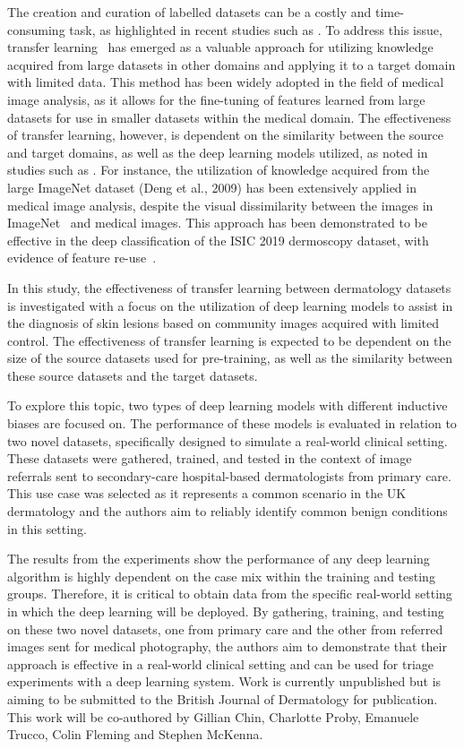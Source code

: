 The creation and curation of labelled datasets can be a costly and time-consuming task, as highlighted in recent studies such as \cite{chin2022prepare}. To address this issue, transfer learning~\citep{srinidhi2020deep} has emerged as a valuable approach for utilizing knowledge acquired from large datasets in other domains and applying it to a target domain with limited data. This method has been widely adopted in the field of medical image analysis, as it allows for the fine-tuning of features learned from large datasets for use in smaller datasets within the medical domain. The effectiveness of transfer learning, however, is dependent on the similarity between the source and target domains, as well as the deep learning models utilized, as noted in studies such as \cite{matsoukas2022makes}. For instance, the utilization of knowledge acquired from the large ImageNet dataset (Deng et al., 2009) has been extensively applied in medical image analysis, despite the visual dissimilarity between the images in ImageNet~\citep{deng2009imagenet} and medical images. This approach has been demonstrated to be effective in the deep classification of the ISIC 2019 dermoscopy dataset, with evidence of feature re-use~\citep{matsoukas2022makes}.

In this study, the effectiveness of transfer learning between dermatology datasets is investigated with a focus on the utilization of deep learning models to assist in the diagnosis of skin lesions based on community images acquired with limited control. The effectiveness of transfer learning is expected to be dependent on the size of the source datasets used for pre-training, as well as the similarity between these source datasets and the target datasets.

To explore this topic, two types of deep learning models with different inductive biases are focused on. The performance of these models is evaluated in relation to two novel datasets, specifically designed to simulate a real-world clinical setting. These datasets were gathered, trained, and tested in the context of image referrals sent to secondary-care hospital-based dermatologists from primary care. This use case was selected as it represents a common scenario in the UK dermatology and the authors aim to reliably identify common benign conditions in this setting.

The results from the experiments show the performance of any deep learning algorithm is highly dependent on the case mix within the training and testing groups. Therefore, it is critical to obtain data from the specific real-world setting in which the deep learning will be deployed. By gathering, training, and testing on these two novel datasets, one from primary care and the other from referred images sent for medical photography, the authors aim to demonstrate that their approach is effective in a real-world clinical setting and can be used for triage experiments with a deep learning system.
Work is currently unpublished but is aiming to be submitted to the British Journal of Dermatology for publication. This work will be co-authored by Gillian Chin, Charlotte Proby, Emanuele Trucco, Colin Fleming and Stephen McKenna.



